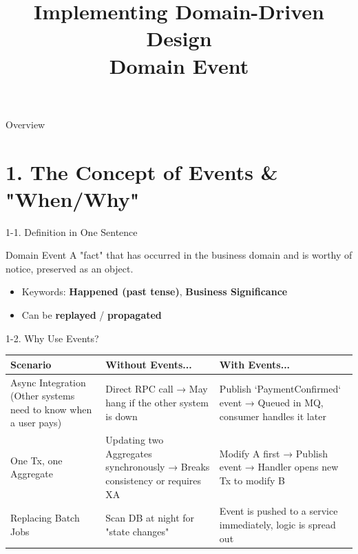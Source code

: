 \documentclass{beamer}
\title[Domain Event]{Implementing Domain-Driven Design \\ Domain Event}
\begin{document}

\begin{frame}
  \titlepage
\end{frame}

\begin{frame}{Overview}
    \scriptsize
    \tableofcontents[hideallsubsections]
\end{frame}

\section{1. The Concept of Events \& "When/Why"}

\begin{frame}{1-1. Definition in One Sentence}
  \begin{block}{Domain Event}
    A "fact" that has occurred in the business domain and is worthy of notice, preserved as an object.
  \end{block}

  \begin{itemize}
    \item<1-> Keywords: \textbf{Happened (past tense)}, \textbf{Business Significance}
    \item<2-> Can be \textbf{replayed} / \textbf{propagated}
  \end{itemize}
\end{frame}

\begin{frame}{1-2. Why Use Events?}
  \tiny
  \begin{tabular}{|p{2.5cm}|p{4cm}|p{4cm}|}
    \hline
    \textbf{Scenario} & \textbf{Without Events...} & \textbf{With Events...} \\
    \hline
    Async Integration (Other systems need to know when a user pays) & Direct RPC call → May hang if the other system is down & Publish `PaymentConfirmed` event → Queued in MQ, consumer handles it later \\
    \hline
    One Tx, one Aggregate & Updating two Aggregates synchronously → Breaks consistency or requires XA & Modify A first → Publish event → Handler opens new Tx to modify B \\
    \hline
    Replacing Batch Jobs & Scan DB at night for "state changes" & Event is pushed to a service immediately, logic is spread out \\
    \hline
  \end{tabular}
\end{frame}
\end{document}
